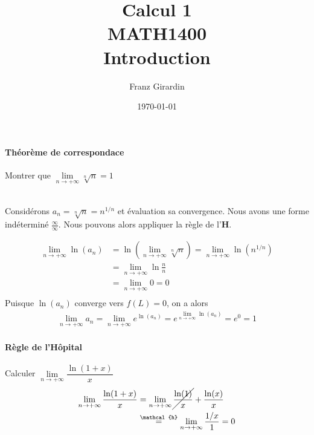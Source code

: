 \documentclass{report}
\title{\Huge{Calcul 1}\\{MATH1400}\\{\textbf{Introduction}}}
\author{\huge{Franz Girardin}}
\date{\today}
\begin{document}
\maketitle

\pagebreak

\pagebreak
\begin{multicols*}{2}


  \paragraph{Théorème de correspondace}
  Montrer que $\lim\limits_{n \to+\infty }\sqrt[n]{n}  = 1$ 

  \mbox{}\vspace{1em}\\
  Considérons $a_n = \sqrt[n]{n} = n^{1/n}$ et évaluation sa convergence. 
  Nous avons une forme indéterminé $ \frac{\infty}{\infty} $. Nous pouvons 
  alors appliquer la règle de l'\textbf{H}. 

  \begin{align*}
    \lim\limits_{n \to+\infty } \ln(a_n) 
        &= 
    \ln\left(\lim\limits_{n \to+\infty }\sqrt[n]{n}\right) 
         = 
        \lim\limits_{n\to+\infty} \ln(n^{1/n}) \\ 
        &=        
        \lim\limits_{n \to+\infty } \ln \frac{n}{n} \\ 
        &= 
        \lim\limits_{n \to+\infty } 0 = 0  \\ 
  \end{align*}
  Puisque $\ln(a_n)$  converge vers $f(L) = 0$, on a alors 
  \begin{align*}
   \lim\limits_{n\to+\infty }a_n 
   = 
   \lim\limits_{n \to+\infty}e^{\ln(a_n)}               
   = 
   e^{\lim\limits_{n \to+\infty }\ln(a_n)}  =  e^0 = 1
  \end{align*}

  \paragraph{Règle de l'Hôpital}
  Calculer $\lim\limits_{n \to+\infty }\dfrac{\ln(1+x)}{x} $    
  \mbox{}\vspace{1em}\\


  \begin{align*}
    \lim\limits_{n \to+\infty }\dfrac{\ln(1+x)}{x} 
    &= \lim\limits_{n \to+\infty }\cancel{\frac{\ln(1)}{x}} + \frac{\ln(x)}{x}    \\ 
    &\overset{\mathcal{h}}{=} 
  \lim\limits_{n\to+\infty } \frac{1/x}{1} = 0
  \end{align*}



\end{multicols*}
\end{document}
